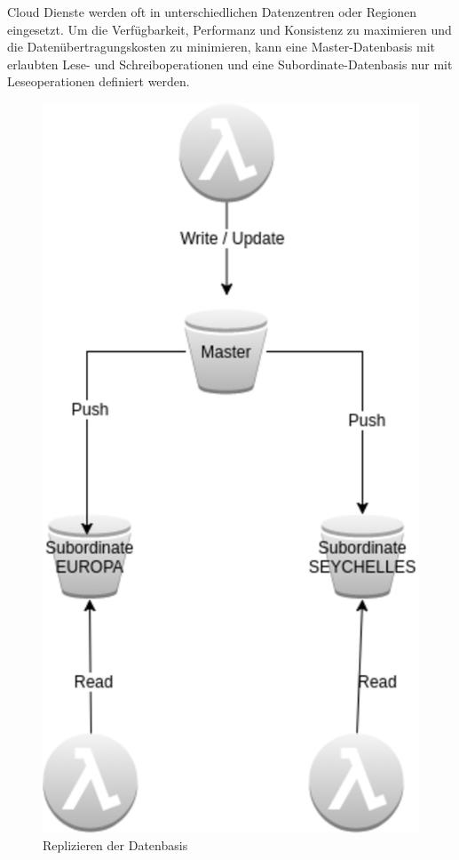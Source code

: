 \documentclass[
12pt,
english,
ngerman,
headsepline,
twoside,
openright,
numbers=noenddot,version=first
]{scrreprt}
\begin{document}
Cloud Dienste werden oft in unterschiedlichen Datenzentren oder Regionen eingesetzt. Um die Verfügbarkeit, Performanz und Konsistenz\label{data-vorteile} zu maximieren und die Datenübertragungskosten zu minimieren, kann eine Master-Datenbasis mit erlaubten Lese- und Schreiboperationen und eine Subordinate-Datenbasis nur mit Leseoperationen definiert werden.\cite{patternsCloud}
\begin{figure}[H]
	\begin{center}
		\includegraphics[scale=0.60]{./pics/aws/master-slave.eps}
		\caption{Replizieren der Datenbasis}
		\label{pic:master-slave}
	\end{center}
\end{figure}
\end{document}
